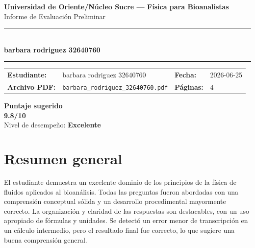 \documentclass[11pt,a4paper]{article}
\begin{document}
\begin{center}
  {\Large\bfseries\color{azulTitulo} Universidad de Oriente/Núcleo Sucre --- Física para Bioanalistas}\\[4pt]
  {\large Informe de Evaluación Preliminar}\\[12pt]
  \rule{\linewidth}{1.2pt}\\[6pt]
  {\LARGE\bfseries barbara rodriguez 32640760}\\[4pt]
  \rule{\linewidth}{0.6pt}
\end{center}

\vspace{4pt}
\begin{tcolorbox}[cajaTitulo, title=Datos del informe]
\begin{tabular}{@{}llll@{}}
  \textbf{Estudiante:}  & barbara rodriguez 32640760  &
  \textbf{Fecha:}       & 2026-06-25 \\[4pt]
  \textbf{Archivo PDF:} & \texttt{barbara\_rodriguez\_32640760.pdf}  &
  \textbf{Páginas:}     & 4 \\
\end{tabular}
\end{tcolorbox}

\vspace{6pt}
\begin{center}
  \begin{tcolorbox}[
    enhanced,
    colback=white, colframe=desempeno_excelente,
    width=0.62\linewidth,
    boxrule=2pt,
    halign=center, valign=center,
    top=8pt, bottom=8pt,
  ]
    \centering
    {\large\bfseries Puntaje sugerido}\\[6pt]
    {\Huge\bfseries\color{desempeno_excelente} 9.8/10}\\[6pt]
    {\large Nivel de desempeño: \textbf{\color{desempeno_excelente} Excelente}}
  \end{tcolorbox}
\end{center}

\section*{Resumen general}
El estudiante demuestra un excelente dominio de los principios de la física de fluidos aplicados al bioanálisis. Todas las preguntas fueron abordadas con una comprensión conceptual sólida y un desarrollo procedimental mayormente correcto. La organización y claridad de las respuestas son destacables, con un uso apropiado de fórmulas y unidades. Se detectó un error menor de transcripción en un cálculo intermedio, pero el resultado final fue correcto, lo que sugiere una buena comprensión general.
\end{document}

